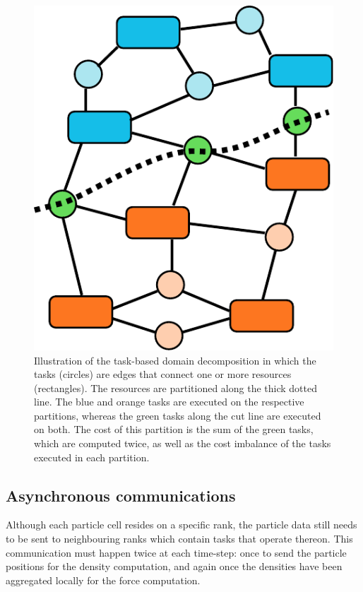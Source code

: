 \documentclass{sig-alternate-05-2015}
\begin{document}
\begin{figure}
\centering
\includegraphics[width=0.85\columnwidth]{Figures/task_graph_cut}
\caption{Illustration of the task-based domain decomposition
  in which the tasks (circles) are edges that connect one or
  more resources (rectangles). The resources are partitioned
  along the thick dotted line. The blue and orange tasks are
  executed on the respective partitions, whereas the green
  tasks along the cut line are executed on both.
  The cost of this partition is the sum of the green tasks,
  which are computed twice, as well as the cost imbalance
  of the tasks executed in each partition.}
\label{taskgraphcut}
\end{figure}  


\subsection{Asynchronous communications}

Although each particle cell resides on a specific rank, the particle
data still needs to be sent to neighbouring ranks which contain
tasks that operate thereon.
This communication must happen twice at each time-step: once to send
the particle positions for the density computation, and again
once the densities have been aggregated locally for the force
computation.
\end{document}
